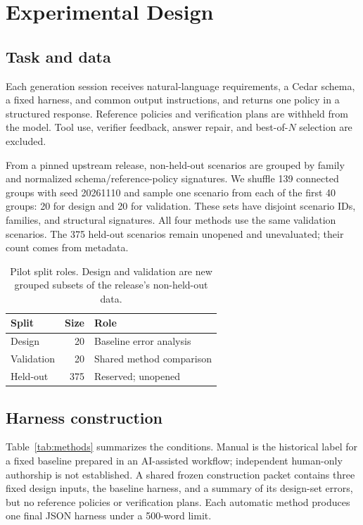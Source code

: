 \documentclass[11pt]{article}
\begin{document}
\section{Experimental Design}
\subsection{Task and data}
Each generation session receives natural-language requirements, a Cedar schema, a fixed harness, and common output instructions, and returns one policy in a structured response. Reference policies and verification plans are withheld from the model. Tool use, verifier feedback, answer repair, and best-of-$N$ selection are excluded.

From a pinned upstream release, non-held-out scenarios are grouped by family and normalized schema/reference-policy signatures. We shuffle 139 connected groups with seed 20261110 and sample one scenario from each of the first 40 groups: 20 for design and 20 for validation. These sets have disjoint scenario IDs, families, and structural signatures. All four methods use the same validation scenarios. The 375 held-out scenarios remain unopened and unevaluated; their count comes from metadata.

\begin{table}[t]
\centering
\begin{tabular}{@{}lrl@{}}
\toprule
Split & Size & Role \\
\midrule
Design & 20 & Baseline error analysis \\
Validation & 20 & Shared method comparison \\
Held-out & 375 & Reserved; unopened \\
\bottomrule
\end{tabular}
\caption{Pilot split roles. Design and validation are new grouped subsets of the release's non-held-out data.}
\label{tab:data}
\end{table}

\subsection{Harness construction}
Table~\ref{tab:methods} summarizes the conditions. Manual is the historical label for a fixed baseline prepared in an AI-assisted workflow; independent human-only authorship is not established. A shared frozen construction packet contains three fixed design inputs, the baseline harness, and a summary of its design-set errors, but no reference policies or verification plans. Each automatic method produces one final JSON harness under a 500-word limit.
\end{document}
